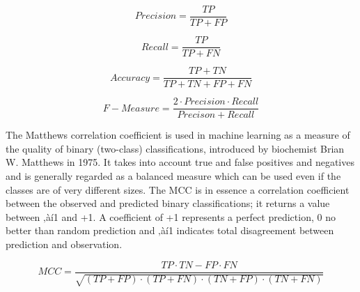 \begin{equation}
Precision = \frac{TP}{TP+FP}
\end{equation}

\begin{equation}
Recall = \frac{TP}{TP+FN}
\end{equation}

\begin{equation}
Accuracy = \frac{TP+TN}{TP+TN+FP+FN}
\end{equation}

\begin{equation}
F-Measure = \frac{2\cdot Precision\cdot Recall}{Precison+Recall}
\end{equation}

The Matthews correlation coefficient is used in machine learning as a measure of the quality of binary (two-class) classifications, introduced by biochemist Brian W. Matthews in 1975. It takes into account true and false positives and negatives and is generally regarded as a balanced measure which can be used even if the classes are of very different sizes. The MCC is in essence a correlation coefficient between the observed and predicted binary classifications; it returns a value between ‚àí1 and +1. A coefficient of +1 represents a perfect prediction, 0 no better than random prediction and ‚àí1 indicates total disagreement between prediction and observation.

\begin{equation}
MCC=\frac{TP\cdot TN-FP\cdot FN}{\sqrt{(TP+FP)\cdot (TP+FN)\cdot (TN+FP)\cdot (TN+FN)}}
\end{equation}


